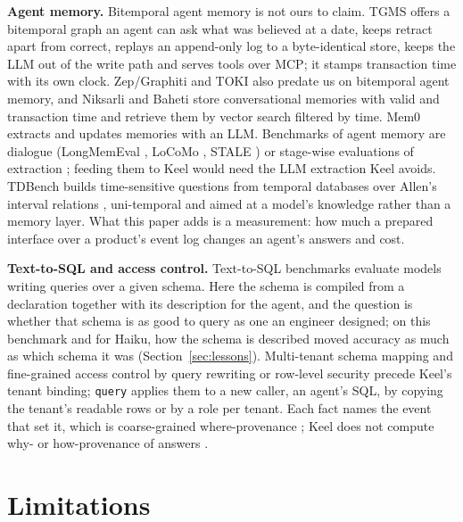 \documentclass[sigconf, nonacm]{acmart}
\newcommand{\code}[1]{\texttt{#1}}
\begin{document}
\textbf{Agent memory.} Bitemporal agent memory is not ours to claim. TGMS \cite{tgms} offers a bitemporal graph an agent can ask what was believed at a date, keeps retract apart from correct, replays an append-only log to a byte-identical store, keeps the LLM out of the write path and serves tools over MCP; it stamps transaction time with its own clock. Zep/Graphiti \cite{zep} and TOKI \cite{toki} also predate us on bitemporal agent memory, and Niksarli and Baheti \cite{niksarli} store conversational memories with valid and transaction time and retrieve them by vector search filtered by time. Mem0 \cite{mem0} extracts and updates memories with an LLM. Benchmarks of agent memory are dialogue (LongMemEval \cite{longmemeval}, LoCoMo \cite{locomo}, STALE \cite{stale}) or stage-wise evaluations of extraction \cite{halumem,memoryagentbench,groundtruth}; feeding them to Keel would need the LLM extraction Keel avoids. TDBench \cite{tdbench} builds time-sensitive questions from temporal databases over Allen's interval relations \cite{allen}, uni-temporal and aimed at a model's knowledge rather than a memory layer. What this paper adds is a measurement: how much a prepared interface over a product's event log changes an agent's answers and cost.

\textbf{Text-to-SQL and access control.} Text-to-SQL benchmarks \cite{spider,bird,gao-text2sql} evaluate models writing queries over a given schema. Here the schema is compiled from a declaration together with its description for the agent, and the question is whether that schema is as good to query as one an engineer designed; on this benchmark and for Haiku, how the schema is described moved accuracy as much as which schema it was (Section~\ref{sec:lessons}). Multi-tenant schema mapping \cite{aulbach} and fine-grained access control by query rewriting \cite{rizvi-fgac} or row-level security \cite{pg-rls} precede Keel's tenant binding; \code{query} applies them to a new caller, an agent's SQL, by copying the tenant's readable rows or by a role per tenant. Each fact names the event that set it, which is coarse-grained where-provenance \cite{buneman}; Keel does not compute why- or how-provenance of answers \cite{green}.

\section{Limitations}
\label{sec:limits}
\end{document}

